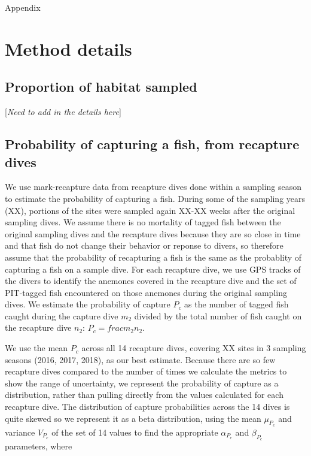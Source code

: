 \documentclass[12pt, oneside]{article}   	%
\begin{document}
\newpage{}

{\LARGE Appendix}

\appendix

\renewcommand{\theequation}{A\arabic{equation}}
\renewcommand{\thetable}{A\arabic{table}}
\setcounter{equation}{0}  %
\setcounter{figure}{0}
\setcounter{table}{0}

\section{Method details}
\subsection*{Proportion of habitat sampled} \label{APP_SEC_ProbHabSampled}
[\textit{Need to add in the details here}]

\newpage{}

\subsection*{Probability of capturing a fish, from recapture dives} \label{APP_SEC_ProbR}

We use mark-recapture data from recapture dives done within a sampling season to estimate the probability of capturing a fish. During some of the sampling years (XX), portions of the sites were sampled again XX-XX weeks after the original sampling dives. We assume there is no mortality of tagged fish between the original sampling dives and the recapture dives because they are so close in time and that fish do not change their behavior or reponse to divers, so therefore assume that the probability of recapturing a fish is the same as the probablity of capturing a fish on a sample dive. For each recapture dive, we use GPS tracks of the divers to identify the anemones covered in the recapture dive and the set of PIT-tagged fish encountered on those anemones during the original sampling dives. We estimate the probability of capture $P_c$ as the number of tagged fish caught during the capture dive $m_2$ divided by the total number of fish caught on the recapture dive $n_2$: $P_c = frac{m_2}{n_2}$. 

We use the mean $P_c$ across all 14 recapture dives, covering XX sites in 3 sampling seasons (2016, 2017, 2018), as our best estimate. Because there are so few recapture dives compared to the number of times we calculate the metrics to show the range of uncertainty, we represent the probability of capture as a distribution, rather than pulling directly from the values calculated for each recapture dive. The distribution of capture probabilities across the 14 dives is quite skewed so we represent it as a beta distribution, using the mean $\mu_{P_c}$ and variance $V_{P_c}$ of the set of 14 values to find the appropriate $\alpha_{P_c}$ and $\beta_{P_c}$ parameters, where 
\end{document}
